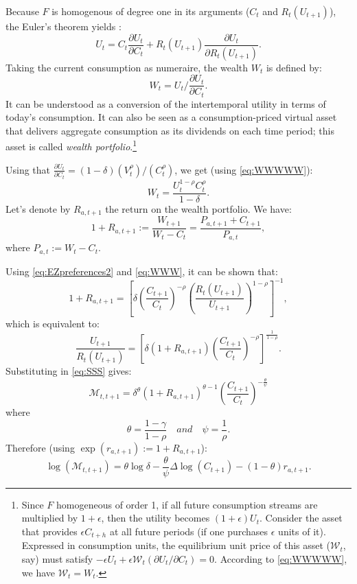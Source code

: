 \documentclass[
  12pt,
]{book}
\theoremstyle{definition}
\theoremstyle{definition}
\theoremstyle{definition}
\theoremstyle{definition}
\theoremstyle{remark}
\begin{document}
Because \(F\) is homogenous of degree one in its arguments (\(C_t\) and \(R_t(U_{t+1})\)), the Euler's theorem yields \citep{HANSEN20073967}:
\begin{equation}
U_t = C_t \frac{\partial U_t}{\partial C_t} +  R_t(U_{t+1}) \frac{\partial U_t}{\partial R_t(U_{t+1})}.\label{eq:XXYXX}
\end{equation}
Taking the current consumption as numeraire, the wealth \(W_t\) is defined by:
\begin{equation}
W_t =   U_t \big/ \frac{\partial U_t}{\partial C_t}.\label{eq:WWWWW}
\end{equation}
It can be understood as a conversion of the intertemporal utility in terms of today's consumption. It can also be seen as a consumption-priced virtual asset that delivers aggregate consumption as its dividends on each time period; this asset is called \emph{wealth portfolio}.\footnote{Since \(F\) homogeneous of order 1, if all future consumption streams are multiplied by \(1+\epsilon\), then the utility becomes \((1+\epsilon)U_t\). Consider the asset that provides \(\epsilon C_{t+h}\) at all future periods (if one purchases \(\epsilon\) units of it). Expressed in consumption units, the equilibrium unit price of this asset (\(\mathcal{W}_t\), say) must satisfy \(-\epsilon U_t + \epsilon \mathcal{W}_t (\partial U_t / \partial C_t)=0\). According to \eqref{eq:WWWWW}, we have \(\mathcal{W}_t = W_t\).}

Using that \(\frac{\partial U_t}{\partial C_t}=(1 - \delta)(V_t^\rho)/(C_t^{\rho})\), we get (using \eqref{eq:WWWWW}):
\begin{equation}
W_t = \frac{U_t^{1-\rho}C_t^\rho}{1 - \delta}.\label{eq:WWW}
\end{equation}
Let's denote by \(R_{a,t+1}\) the return on the wealth portfolio. We have:
\begin{equation}
1+R_{a,t+1} := \frac{W_{t+1}}{W_t - C_t} = \frac{P_{a,t+1}+C_{t+1}}{P_{a,t}},\label{eq:Ra}
\end{equation}
where \(P_{a,t} := W_t - C_t\).

Using \eqref{eq:EZpreferences2} and \eqref{eq:WWW}, it can be shown that:
\[
1+R_{a,t+1} = \left[ \delta \left( \frac{C_{t+1}}{C_t} \right)^{-\rho} \left( \frac{R_t(U_{t+1})}{U_{t+1}} \right)^{1-\rho} \right]^{-1},
\]
which is equivalent to:
\[
\frac{U_{t+1}}{R_t(U_{t+1})} = \left[ \delta (1+ R_{a,t+1}) \left( \frac{C_{t+1}}{C_t} \right)^{-\rho}  \right]^{\frac{1}{1-\rho}}.
\]
Substituting in \eqref{eq:SSS} gives:
\begin{equation}
\mathcal{M}_{t,t+1} =  \delta^{\theta} (1+R_{a,t+1})^{\theta - 1} \left( \frac{C_{t+1}}{C_t} \right)^{- \frac{\theta}{\psi}}
\end{equation}
where
\[
\theta = \frac{1-\gamma}{1-\rho} \quad and \quad \psi = \frac{1}{\rho}.
\]
Therefore (using \(\exp(r_{a,t+1}):=1+R_{a,t+1}\)):
\begin{equation}
\boxed{\log(\mathcal{M}_{t,t+1}) = \theta \log \delta - \frac{\theta}{\psi} \Delta \log(C_{t+1}) - (1-\theta) r_{a,t+1}.}\label{eq:sdfEZ}
\end{equation}
\end{document}
